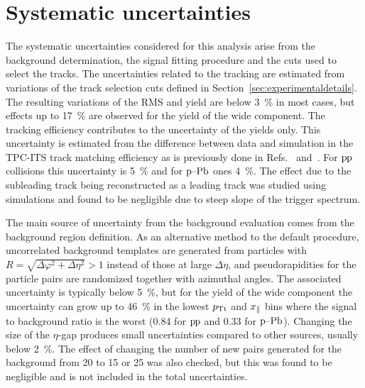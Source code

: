 \section{Systematic uncertainties}
\label{sec:systematicerrors}

The systematic uncertainties considered for this analysis arise from the background determination, the signal fitting procedure and the cuts used to select the tracks. The uncertainties related to the tracking are estimated from variations of the track selection cuts defined in Section~\ref{sec:experimentaldetails}. The resulting variations of the RMS and yield are below 3~\% in most cases, but effects up to 17~\% are observed for the yield of the wide component. The tracking efficiency contributes to the uncertainty of the yields only. This uncertainty is estimated from the difference between data and simulation in the TPC-ITS track matching efficiency as is previously done in Refs.~\cite{spectrumReferencePp} and~\cite{spectrumReferencepPb}.  For $\mbox{p\kern-0.05em p}$ collisions this uncertainty is 5~\% and for $\mbox{p--Pb}$ ones 4~\%. The effect due to the subleading track being reconstructed as a leading track was studied using simulations and found to be negligible due to steep slope of the trigger spectrum.

The main source of uncertainty from the background evaluation comes from the background region definition. As an alternative method to the default procedure, uncorrelated background templates are generated from particles with $R = \sqrt{\Delta\varphi^2 + \Delta\eta^2} > 1$ instead of those at large $\Delta\eta$, and pseudorapidities for the particle pairs are randomized together with azimuthal angles. The associated uncertainty is typically below 5~\%, but for the yield of the wide component the uncertainty can grow up to 46~\% in the lowest $p_{\rm Tt}$ and $x_{\parallel}$ bins where the signal to background ratio is the worst (0.84 for $\mbox{p\kern-0.05em p}$ and 0.33 for $\mbox{p--Pb}$). Changing the size of the $\eta$-gap produces small uncertainties compared to other sources, usually below 2~\%. The effect of changing the number of new pairs generated for the background from 20 to 15 or 25 was also checked, but this was found to be negligible and is not included in the total uncertainties.

